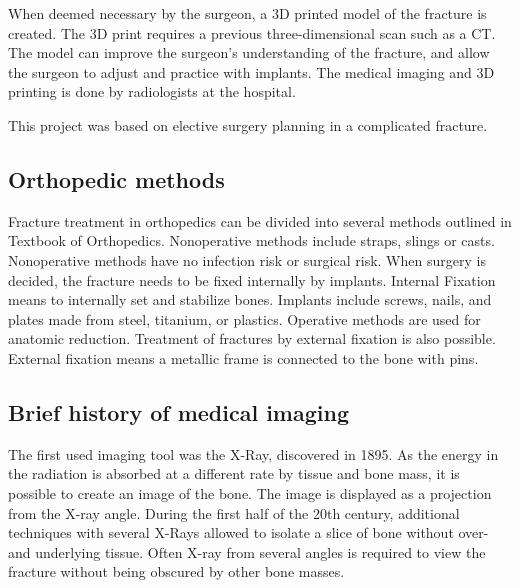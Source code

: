 \documentclass[a4paper]{report}
\begin{document}
When deemed necessary by the surgeon, a 3D printed model of the fracture is created. The 3D print requires a previous three-dimensional scan such as a CT. The model can improve the surgeon's understanding of the fracture, and allow the surgeon to adjust and practice with implants. The medical imaging and 3D printing is done by radiologists at the hospital.

This project was based on elective surgery planning in a complicated fracture.

\subsection{Orthopedic methods}

Fracture treatment in orthopedics can be divided into several methods outlined in Textbook of Orthopedics\cite{ebnezar_textbook_2016}.
Nonoperative methods include straps, slings or casts.
Nonoperative methods have no infection risk or surgical risk.
When surgery is decided, the fracture needs to be fixed internally by implants.
Internal Fixation means to internally set and stabilize bones\cite{ebnezar_textbook_2016}.
Implants include screws, nails, and plates made from steel, titanium, or plastics.
Operative methods are used for anatomic reduction.
Treatment of fractures by external fixation is also possible. External fixation means a metallic frame is connected to the bone with pins.


\subsection{Brief history of medical imaging}
The first used imaging tool was the X-Ray, discovered in 1895\cite{hamblen_outline_2010}\cite{suetens_fundamentals_2017}. As the energy in the radiation is absorbed at a different rate by tissue and bone mass, it is possible to create an image of the bone. The image is displayed as a projection from the X-ray angle. During the first half of the 20th century, additional techniques with several X-Rays allowed to isolate a slice of bone without over- and underlying tissue. Often X-ray from several angles is required to view the fracture without being obscured by other bone masses\cite{ebnezar_textbook_2016}.
\end{document}
